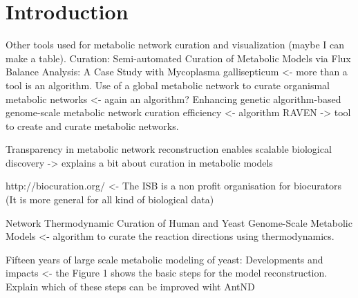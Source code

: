 \section{Introduction}

Other tools used for metabolic network curation and visualization (maybe I can make a table).
Curation: 
Semi-automated Curation of Metabolic Models via Flux Balance Analysis: A Case Study with Mycoplasma gallisepticum <- more than a tool is an algorithm.
Use of a global metabolic network to curate organismal metabolic networks <- again an algorithm?
Enhancing genetic algorithm-based genome-scale metabolic network curation efficiency <- algorithm
RAVEN -> tool to create and curate metabolic networks.

Transparency in metabolic network reconstruction enables scalable biological discovery -> explains a bit about curation in metabolic models

http://biocuration.org/ <- The ISB is a non profit organisation for biocurators (It is more general for all kind of biological data)

Network Thermodynamic Curation of Human and Yeast Genome-Scale Metabolic Models <- algorithm to curate the reaction directions using thermodynamics.

Fifteen years of large scale metabolic modeling of yeast: Developments and impacts <- the Figure 1 shows the basic steps for the model reconstruction. Explain which of these steps can be improved wiht AntND